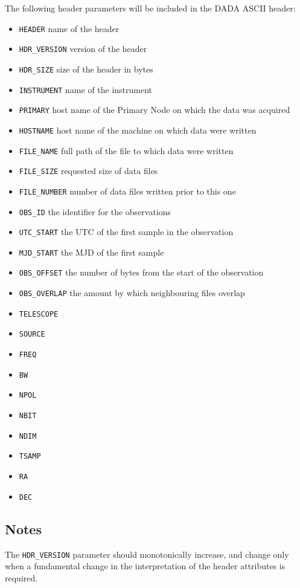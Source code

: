The following header parameters will be included in the DADA ASCII header:
\begin{itemize}
\item{\tt HEADER} name of the header
\item{\tt HDR\_VERSION} version of the header
\item{\tt HDR\_SIZE} size of the header in bytes
\item{\tt INSTRUMENT} name of the instrument
\item{\tt PRIMARY} host name of the Primary Node on which the data was acquired
\item{\tt HOSTNAME} host name of the machine on which data were written
\item{\tt FILE\_NAME} full path of the file to which data were written
\item{\tt FILE\_SIZE} requested size of data files
\item{\tt FILE\_NUMBER} number of data files written prior to this one
\item{\tt OBS\_ID} the identifier for the observations
\item{\tt UTC\_START} the UTC of the first sample in the observation
\item{\tt MJD\_START} the MJD of the first sample
\item{\tt OBS\_OFFSET} the number of bytes from the start of the observation
\item{\tt OBS\_OVERLAP} the amount by which neighbouring files overlap
\item{\tt TELESCOPE}
\item{\tt SOURCE}
\item{\tt FREQ}
\item{\tt BW}
\item{\tt NPOL}
\item{\tt NBIT}
\item{\tt NDIM}
\item{\tt TSAMP}
\item{\tt RA}
\item{\tt DEC}
\end{itemize}


\subsection{Notes}

The {\tt HDR\_VERSION} parameter should monotonically increase, and
change only when a fundamental change in the interpretation of the
header attributes is required.

